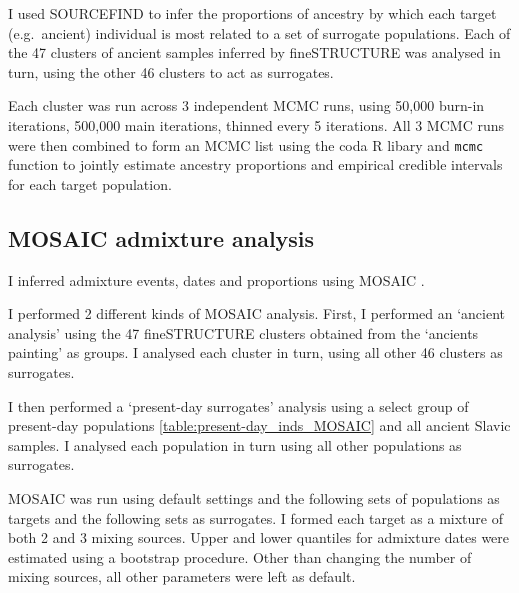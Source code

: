 I used SOURCEFIND \cite{Chacon-Duque2018} to infer the proportions of ancestry by which each target (e.g.\ ancient) individual is most related to a set of surrogate populations. Each of the 47 clusters of ancient samples inferred by fineSTRUCTURE was analysed in turn, using the other 46 clusters to act as surrogates.    

Each cluster was run across 3 independent MCMC runs, using 50,000 burn-in iterations, 500,000 main iterations, thinned every 5 iterations. All 3 MCMC runs were then combined to form an MCMC list using the coda R libary \cite{oro22547} and \texttt{mcmc} function to jointly estimate ancestry proportions and empirical credible intervals for each target population. 

\subsection{MOSAIC admixture analysis}

I inferred admixture events, dates and proportions using  MOSAIC \cite{MOSAIC_2019}. 

I performed 2 different kinds of MOSAIC analysis. First, I performed an `ancient analysis' using the 47 fineSTRUCTURE clusters obtained from the `ancients painting' as groups. I analysed each cluster in turn, using all other 46 clusters as surrogates. 

I then performed a `present-day surrogates' analysis using a select group of present-day populations \ref{table:present-day_inds_MOSAIC} and all ancient Slavic samples. I analysed each population in turn using all other populations as surrogates.  

MOSAIC was run using default settings and the following sets of populations as targets and the following sets as surrogates. I formed each target as a mixture of both 2 and 3 mixing sources. Upper and lower quantiles for admixture dates were estimated using a bootstrap procedure. Other than changing the number of mixing sources, all other parameters were left as default.  

